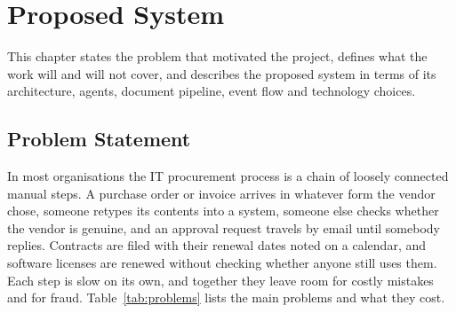 
\chapter{Proposed System} \label{chap3}

This chapter states the problem that motivated the project, defines what the work will and will not cover, and describes the proposed system in terms of its architecture, agents, document pipeline, event flow and technology choices.

\section{Problem Statement}

In most organisations the IT procurement process is a chain of loosely connected manual steps. A purchase order or invoice arrives in whatever form the vendor chose, someone retypes its contents into a system, someone else checks whether the vendor is genuine, and an approval request travels by email until somebody replies. Contracts are filed with their renewal dates noted on a calendar, and software licenses are renewed without checking whether anyone still uses them. Each step is slow on its own, and together they leave room for costly mistakes and for fraud. Table~\ref{tab:problems} lists the main problems and what they cost.

